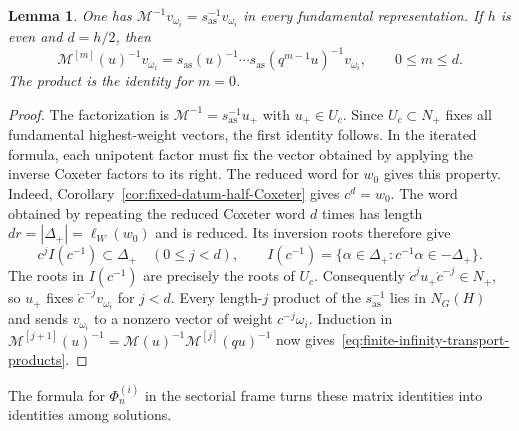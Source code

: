 \documentclass[11pt,leqno]{amsart}
\numberwithin{equation}{section}
\theoremstyle{plain}
\newtheorem{lemma}[theorem]{Lemma}
\theoremstyle{definition}
\theoremstyle{plain}
\theoremstyle{definition}
\theoremstyle{remark}
\begin{document}
\begin{lemma}\label{lem:analytic-finite-columns}\label{prop:finite-infinity-transport}
One has $\mathscr M^{-1} v_{\omega_i}=s_{\mathrm{as}}^{-1}v_{\omega_i}$ in every fundamental representation.  If $h$ is even and $d=h/2$, then
\begin{equation}\label{eq:finite-infinity-transport-products}
 \mathscr M^{[m]}(u)^{-1}v_{\omega_i}
 =s_{\mathrm{as}}(u)^{-1}\cdots
   s_{\mathrm{as}}(q^{m-1}u)^{-1}v_{\omega_i},
 \qquad 0\le m\le d.
\end{equation}
The product is the identity for $m=0$.
\end{lemma}
\begin{proof}
The factorization is $\mathscr M^{-1}=s_{\mathrm{as}}^{-1}u_+$ with $u_+\in U_c$.  Since $U_c\subset N_+$ fixes all fundamental highest-weight vectors, the first identity follows.  In the iterated formula, each unipotent factor must fix the vector obtained by applying the inverse Coxeter factors to its right.  The reduced word for $w_0$ gives this property.  Indeed, Corollary~\ref{cor:fixed-datum-half-Coxeter} gives $c^d=w_0$.  The word obtained by repeating the reduced Coxeter word $d$ times has length $dr=|\Delta_+|=\ell_W(w_0)$ and is reduced.  Its inversion roots therefore give
\[
 c^j I(c^{-1})\subset\Delta_+\quad(0\le j<d),
 \qquad I(c^{-1})=\{\alpha\in\Delta_+:c^{-1}\alpha\in-\Delta_+\}.
\]
The roots in $I(c^{-1})$ are precisely the roots of $U_c$.  Consequently $\dot c^ju_+\dot c^{-j}\in N_+$, so $u_+$ fixes $\dot c^{-j}v_{\omega_i}$ for $j<d$.  Every length-$j$ product of the $s_{\mathrm{as}}^{-1}$ lies in $N_G(H)$ and sends $v_{\omega_i}$ to a nonzero vector of weight $c^{-j}\omega_i$.  Induction in
$\mathscr M^{[j+1]}(u)^{-1}=\mathscr M(u)^{-1}\mathscr M^{[j]}(qu)^{-1}$ now gives~\eqref{eq:finite-infinity-transport-products}.
\end{proof}

The formula for $\Phi_n^{(i)}$ in the sectorial frame turns these matrix identities into identities among solutions.
\end{document}
